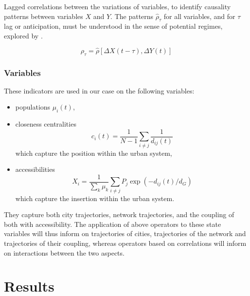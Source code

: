 \documentclass[graybox]{svmult}
\begin{document}
Lagged correlations between the variations of variables, to identify causality patterns between variables $X$ and $Y$. The patterns $\hat{\rho}_{\tau}$ for all variables, and for $\tau$ lag or anticipation, must be understood in the sense of potential regimes, explored by \cite{raimbault2017identification}.

\begin{equation}
\rho_{\tau} = \hat{\rho}\left[\Delta X(t-\tau),\Delta Y(t)\right]
\end{equation}






\subsubsection{Variables}


These indicators are used in our case on the following variables:
\begin{itemize}
	\item populations $\mu_i(t)$,
	\item closeness centralities
	\[c_i(t) = \frac{1}{N-1}\sum_{i\neq j} \frac{1}{d_{ij}(t)}\]
	which capture the position within the urban system,
	\item accessibilities \[X_i = \frac{1}{\sum_k \mu_k}\sum_{i\neq j} P_j \exp{\left(- d_{ij}(t)/d_G\right)}\] which capture the insertion within the urban system.
\end{itemize}

They capture both city trajectories, network trajectories, and the coupling of both with accessibility. The application of above operators to these state variables will thus inform on trajectories of cities, trajectories of the network and trajectories of their coupling, whereas operators based on correlations will inform on interactions between the two aspects.



\section{Results}
\end{document}
